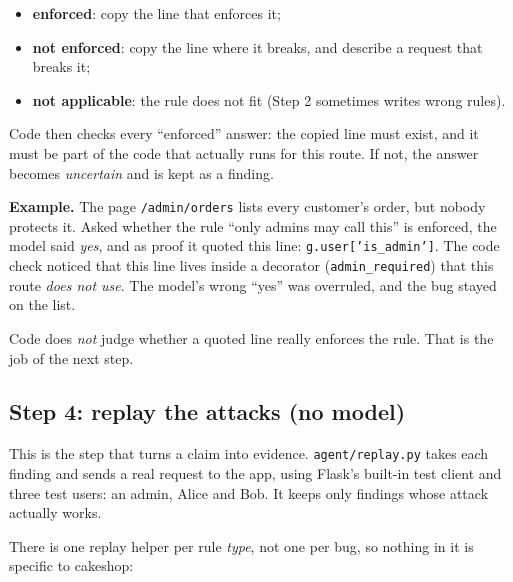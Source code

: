 \documentclass[11pt,a4paper]{article}
\newcommand{\code}[1]{\texttt{#1}}
\begin{document}
\begin{itemize}
  \item \textbf{enforced}: copy the line that enforces it;
  \item \textbf{not enforced}: copy the line where it breaks, and describe a request that breaks it;
  \item \textbf{not applicable}: the rule does not fit (Step 2 sometimes writes wrong rules).
\end{itemize}

Code then checks every ``enforced'' answer: the copied line must exist, and it must be part of the code that
actually runs for this route. If not, the answer becomes \emph{uncertain} and is kept as a finding.

\textbf{Example.} The page \code{/admin/orders} lists every customer's order, but nobody protects it.
Asked whether the rule ``only admins may call this'' is enforced, the model said \emph{yes}, and as proof
it quoted this line: \code{g.user['is\_admin']}. The code check noticed that this line lives inside a decorator
(\code{admin\_required}) that this route \emph{does not use}. The model's wrong ``yes'' was overruled, and the
bug stayed on the list.

Code does \emph{not} judge whether a quoted line really enforces the rule. That is the job of the next step.

\subsection{Step 4: replay the attacks (no model)}
This is the step that turns a claim into evidence. \code{agent/replay.py} takes each finding and sends a real
request to the app, using Flask's built-in test client and three test users: an admin, Alice and Bob. It keeps
only findings whose attack actually works.

There is one replay helper per rule \emph{type}, not one per bug, so nothing in it is specific to cakeshop:
\end{document}
